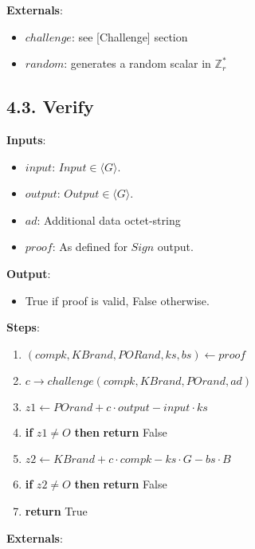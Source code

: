 \documentclass[
]{article}
\providecommand{\tightlist}{%
  \setlength{\itemsep}{0pt}\setlength{\parskip}{0pt}}
\begin{document}
\textbf{Externals}:

\begin{itemize}
\tightlist
\item
  \(challenge\): see {[}Challenge{]} section
\item
  \(random\): generates a random scalar in \(\mathbb{Z}^*_r\)
\end{itemize}

\hypertarget{verify-1}{%
\subsection{4.3. Verify}\label{verify-1}}

\textbf{Inputs}:

\begin{itemize}
\tightlist
\item
  \(input\): \(Input \in \langle G \rangle\).
\item
  \(output\): \(Output \in \langle G \rangle\).
\item
  \(ad\): Additional data octet-string
\item
  \(proof\): As defined for \(Sign\) output.
\end{itemize}

\textbf{Output}:

\begin{itemize}
\tightlist
\item
  True if proof is valid, False otherwise.
\end{itemize}

\textbf{Steps}:

\begin{enumerate}
\def\labelenumi{\arabic{enumi}.}
\tightlist
\item
  \((compk, KBrand, PORand, ks, bs) \leftarrow proof\)
\item
  \(c \rightarrow challenge(compk, KBrand, POrand, ad)\)
\item
  \(z1 \leftarrow POrand + c \cdot output - input \cdot ks\)
\item
  \textbf{if} \(z1 \neq O\) \textbf{then} \textbf{return} False
\item
  \(z2 \leftarrow KBrand + c \cdot compk - ks \cdot G - bs \cdot B\)
\item
  \textbf{if} \(z2 \neq O\) \textbf{then} \textbf{return} False
\item
  \textbf{return} True
\end{enumerate}

\textbf{Externals}:
\end{document}
